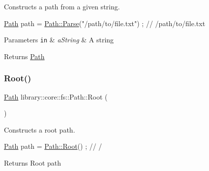 Constructs a path from a given string. 


\begin{DoxyCode}
\hyperlink{classlibrary_1_1core_1_1fs_1_1_path_aabc4240fc08479d1bff6b9753f2b5cc2}{Path} path = \hyperlink{classlibrary_1_1core_1_1fs_1_1_path_a6ba644b6609507e724c217bf2020f5ae}{Path::Parse}(\textcolor{stringliteral}{"/path/to/file.txt"}) ; \textcolor{comment}{// /path/to/file.txt}
\end{DoxyCode}



\begin{DoxyParams}[1]{Parameters}
\mbox{\tt in}  & {\em a\+String} & A string \\
\hline
\end{DoxyParams}
\begin{DoxyReturn}{Returns}
\hyperlink{classlibrary_1_1core_1_1fs_1_1_path}{Path} 
\end{DoxyReturn}
\mbox{\label{classlibrary_1_1core_1_1fs_1_1_path_a59d9a7b2fcca844a82d22742b5a110ac}} 
\subsubsection{\texorpdfstring{Root()}{Root()}}
{\footnotesize\ttfamily \hyperlink{classlibrary_1_1core_1_1fs_1_1_path}{Path} library\+::core\+::fs\+::\+Path\+::\+Root (\begin{DoxyParamCaption}{ }\end{DoxyParamCaption})\hspace{0.3cm}{\ttfamily [static]}}



Constructs a root path. 


\begin{DoxyCode}
\hyperlink{classlibrary_1_1core_1_1fs_1_1_path_aabc4240fc08479d1bff6b9753f2b5cc2}{Path} path = \hyperlink{classlibrary_1_1core_1_1fs_1_1_path_a59d9a7b2fcca844a82d22742b5a110ac}{Path::Root}() ; \textcolor{comment}{// /}
\end{DoxyCode}


\begin{DoxyReturn}{Returns}
Root path 
\end{DoxyReturn}
\mbox{\label{classlibrary_1_1core_1_1fs_1_1_path_a94a2bd454a137249bab970e29a5a95f2}} 
